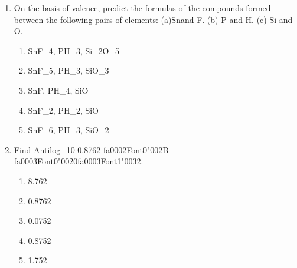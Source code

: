 \documentclass[12pt]{article}
\begin{document}
\begin{enumerate}[label=\arabic*.]
\item On the basis of valence, predict the formulas of the compounds formed between the
following pairs of elements: (a)Snand F. (b) P and H. (c) Si and O.
\begin{enumerate}[label=(\alph*)]
    \item SnF\_4, PH\_3, Si\_2O\_5
    \item SnF\_5, PH\_3, SiO\_3
    \item SnF, PH\_4, SiO
    \item SnF\_2, PH\_2, SiO
    \item SnF\_6, PH\_3, SiO\_2
\end{enumerate}
\item Find Antilog\_10 0.8762 {\csname fa0002Font0\endcsname\char"002B} {\csname fa0003Font0\endcsname\char"0020}{\csname fa0003Font1\endcsname\char"0032}.
\begin{enumerate}[label=(\alph*)]
    \item 8.762
    \item 0.8762
    \item 0.0752
    \item 0.8752
    \item 1.752
\end{enumerate}
\end{enumerate}
\end{document}
